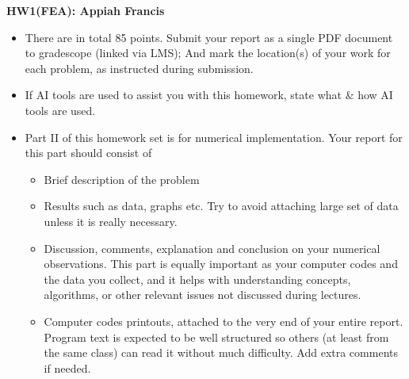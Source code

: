 \documentclass[11pt]{article}      %
\begin{document}

\begin{center}
{\bf\large HW1(FEA): Appiah Francis}\\
\vspace{0.05in}
\end{center}
{\em 
\begin{itemize}
\item [1.)] There are in total 85 points. Submit your report as a single PDF document to gradescope (linked via LMS); And mark the location(s) of your work for each problem,  as instructed during submission.
\item [2.)] If AI tools are used to assist you with this homework, state what \& how AI tools are used.
\item [3.)] Part II of this homework set is for numerical implementation. Your report for this part should consist of
{\sf 
\begin{itemize}
\item  Brief description of the problem
\item Results such as data, graphs etc. Try to avoid attaching large set of data unless it is really necessary.
\item Discussion, comments, explanation and conclusion on your numerical observations. This part is equally important as your computer codes and the data you collect, and it helps with understanding concepts, algorithms, or other relevant issues not discussed during lectures. 

\item Computer codes printouts, attached to the very end of your entire report. Program text is expected to be well structured so others (at least from the same class) can read it without much difficulty. Add extra comments if needed.
\end{itemize}
}


\end{itemize}
}
\end{document}
